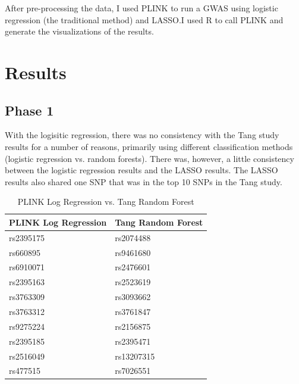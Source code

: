 \documentclass{article}
\begin{document}
After pre-processing the data, I used PLINK to run a GWAS using logistic 
regression (the traditional method) and LASSO.\@ I used R\cite{RCoreTeam2016} to 
call PLINK and generate the visualizations of the results.

\section*{Results}
\subsection*{Phase 1}
With the logisitic regression, there was no consistency with the Tang study 
results for a number of reasons, primarily using different classification 
methods (logistic regression vs. random forests). There was, however, a little
consistency between the logistic regression results and the LASSO results. The 
LASSO results also shared one SNP that was in the top 10 SNPs in the Tang study.

\begin{table}[h]
\centering
\caption{PLINK Log Regression vs. Tang Random Forest}
\label{Table 1}
\begin{tabular}{@{}ll@{}}
\toprule
PLINK Log Regression & Tang Random Forest \\ \midrule
rs2395175            & rs2074488          \\
rs660895             & rs9461680          \\
rs6910071            & rs2476601          \\
rs2395163            & rs2523619          \\
rs3763309            & rs3093662          \\
rs3763312            & rs3761847          \\
rs9275224            & rs2156875          \\
rs2395185            & rs2395471          \\
rs2516049            & rs13207315         \\
rs477515             & rs7026551          \\ \bottomrule
\end{tabular}
\end{table}
\end{document}
